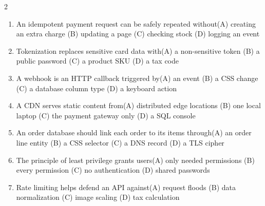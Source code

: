 \documentclass[a4paper]{article}
\begin{document}
\begin{multicols*}{2}
\begin{enumerate}[resume]
\item An idempotent payment request can be safely repeated without\newline\hspace*{0.6em}(A) creating an extra charge \quad (B) updating a page \newline\hspace*{0.6em}(C) checking stock \quad (D) logging an event
\item Tokenization replaces sensitive card data with\newline\hspace*{0.6em}(A) a non-sensitive token \quad (B) a public password \newline\hspace*{0.6em}(C) a product SKU \quad (D) a tax code
\item A webhook is an HTTP callback triggered by\newline\hspace*{0.6em}(A) an event \quad (B) a CSS change \newline\hspace*{0.6em}(C) a database column type \quad (D) a keyboard action
\item A CDN serves static content from\newline\hspace*{0.6em}(A) distributed edge locations \quad (B) one local laptop \newline\hspace*{0.6em}(C) the payment gateway only \quad (D) a SQL console
\item An order database should link each order to its items through\newline\hspace*{0.6em}(A) an order line entity \quad (B) a CSS selector \newline\hspace*{0.6em}(C) a DNS record \quad (D) a TLS cipher
\item The principle of least privilege grants users\newline\hspace*{0.6em}(A) only needed permissions \quad (B) every permission \newline\hspace*{0.6em}(C) no authentication \quad (D) shared passwords
\item Rate limiting helps defend an API against\newline\hspace*{0.6em}(A) request floods \quad (B) data normalization \newline\hspace*{0.6em}(C) image scaling \quad (D) tax calculation

\end{enumerate}
\end{multicols*}
\end{document}

